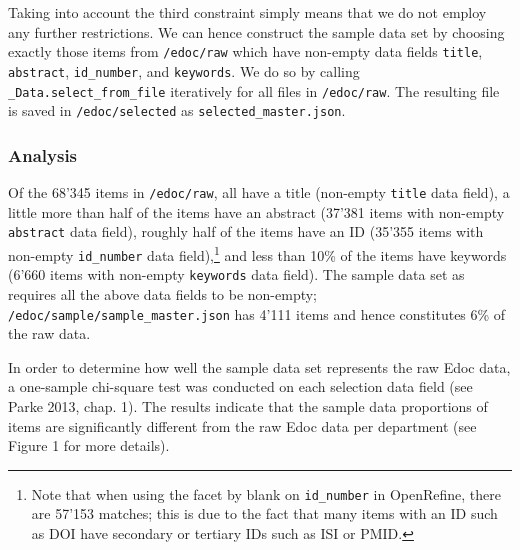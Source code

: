 Taking into account the third constraint simply means that we do not
employ any further restrictions. We can hence construct the sample data
set by choosing exactly those items from \texttt{/edoc/raw} which have
non-empty data fields \texttt{title}, \texttt{abstract},
\texttt{id\_number}, and \texttt{keywords}. We do so by calling
\texttt{\_Data.select\_from\_file} iteratively for all files in
\texttt{/edoc/raw}. The resulting file is saved in
\texttt{/edoc/selected} as \texttt{selected\_master.json}.

\hypertarget{analysis}{%
\subsubsection{Analysis}\label{analysis}}

Of the 68'345 items in \texttt{/edoc/raw}, all have a title (non-empty
\texttt{title} data field), a little more than half of the items have an
abstract (37'381 items with non-empty \texttt{abstract} data field),
roughly half of the items have an ID (35'355 items with non-empty
\texttt{id\_number} data field),\footnote{Note that when using the facet
  by blank on \texttt{id\_number} in OpenRefine, there are 57'153
  matches; this is due to the fact that many items with an ID such as
  DOI have secondary or tertiary IDs such as ISI or PMID.} and less than
10\% of the items have keywords (6'660 items with non-empty
\texttt{keywords} data field). The sample data set as requires all the
above data fields to be non-empty;
\texttt{/edoc/sample/sample\_master.json} has 4'111 items and hence
constitutes 6\% of the raw data.

In order to determine how well the sample data set represents the raw
Edoc data, a one-sample chi-square test was conducted on each selection
data field (see Parke 2013, chap. 1). The results indicate that the
sample data proportions of items are significantly different from the
raw Edoc data per department (see Figure 1 for more details).

